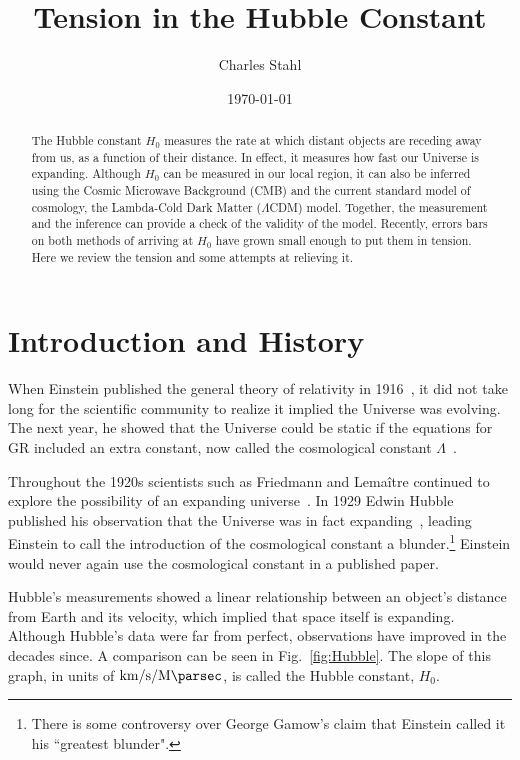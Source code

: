 \documentclass[12pt]{article}
\title{Tension in the Hubble Constant}
\author{Charles Stahl}
\date{\today}
\newcommand{\units}{\kilo\meter\per\second\per\mega\parsec}
\newcommand{\hnaught}[1]{\SI{#1}{\units}}
\renewcommand{\L}{$\Lambda$}
\begin{document}
\begin{singlespace}
\maketitle

\begin{abstract}
\normalsize
The Hubble constant $H_0$ measures the rate at which distant objects are receding away from us, as a function of their distance. In effect, it measures how fast our Universe is expanding. Although $H_0$ can be measured in our local region, it can also be inferred using the Cosmic Microwave Background (CMB) and the current standard model of cosmology, the Lambda-Cold Dark Matter (\L CDM) model. Together, the measurement and the inference can provide a check of the validity of the model. Recently, errors bars on both methods of arriving at $H_0$ have grown small enough to put them in tension. Here we review the tension and some attempts at relieving it.
\end{abstract}
\end{singlespace}

\section{Introduction and History} \label{sec:int}

When Einstein published the general theory of relativity in 1916~\cite{Einstein1916}, it did not take long for the scientific community to realize it implied the Universe was evolving. The next year, he showed that the Universe could be static if the equations for GR included an extra constant, now called the cosmological constant $\Lambda$~\cite{Einstein1917}.

Throughout the 1920s scientists such as Friedmann and Lema\^{i}tre continued to explore the possibility of an expanding universe~\cite{Friedman1922, Lemaitre1927}. In 1929 Edwin Hubble published his observation that the Universe was in fact expanding~\cite{Hubble1929}, leading Einstein to call the introduction of the cosmological constant a blunder.\footnote{There is some controversy over George Gamow's claim that Einstein called it his ``greatest blunder".} Einstein would never again use the cosmological constant in a published paper.

Hubble's measurements showed a linear relationship between an object's distance from Earth and its velocity, which implied that space itself is expanding. Although Hubble's data were far from perfect, observations have improved in the decades since. A comparison can be seen in Fig.~\ref{fig:Hubble}. The slope of this graph, in units of $\hnaught{}$, is called the Hubble constant, $H_0$.
\end{document}
